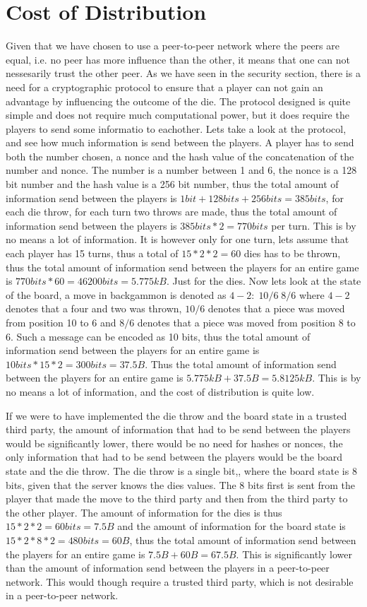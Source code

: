 \documentclass[ twoside,openright,titlepage,numbers=noenddot,headinclude,%
                footinclude=true,cleardoublepage=empty,abstractoff, %
                BCOR=5mm,paper=a4,fontsize=11pt,%
                ngerman,american,%
                ]{scrreprt}
\begin{document}
\section{Cost of Distribution}
Given that we have chosen to use a peer-to-peer network where the peers are equal, i.e. no peer has more influence than the other, it means that one can not nessesarily trust the other peer. As we have seen in the security section, there is a need for a cryptographic protocol to ensure that a player can not gain an advantage by influencing the outcome of the die. The protocol designed is quite simple and does not require much computational power, but it does require the players to send some informatio to eachother. Lets take a look at the protocol, and see how much information is send between the players. A player has to send both the number chosen, a nonce and the hash value of the concatenation of the number and nonce. The number is a number between 1 and 6, the nonce is a 128 bit number and the hash value is a 256 bit number, thus the total amount of information send between the players is $1bit+128bits+256bits = 385bits$, for each die throw, for each turn two throws are made, thus the total amount of information send between the players is $385bits*2 = 770bits$ per turn. This is by no means a lot of information. It is however only for one turn, lets assume that each player has 15 turns, thus a total of $15*2*2 = 60$ dies has to be thrown, thus the total amount of information send between the players for an entire game is $770bits*60 = 46200bits = 5.775kB$. Just for the dies. Now lets look at the state of the board, a move in backgammon is denoted as $4-2:\; 10/6\; 8/6$ where $4-2$ denotes that a four and two was thrown, $10/6$ denotes that a piece was moved from position 10 to 6 and $8/6$ denotes that a piece was moved from position 8 to 6. Such a message can be encoded as 10 bits, thus the total amount of information send between the players for an entire game is $10bits*15*2 = 300bits = 37.5B$. Thus the total amount of information send between the players for an entire game is $5.775kB + 37.5B = 5.8125kB$. This is by no means a lot of information, and the cost of distribution is quite low. 

If we were to have implemented the die throw and the board state in a trusted third party, the amount of information that had to be send between the players would be significantly lower, there would be no need for hashes or nonces, the only information that had to be send between the players would be the board state and the die throw. The die throw is a single bit,, where the board state is 8 bits, given that the server knows the dies values. The 8 bits first is sent from the player that made the move to the third party and then from the third party to the other player. The amount of information for the dies is thus $15*2*2 = 60bits = 7.5B$ and the amount of information for the board state is $15*2*8*2 = 480bits = 60B$, thus the total amount of information send between the players for an entire game is $7.5B + 60B = 67.5B$. This is significantly lower than the amount of information send between the players in a peer-to-peer network. This would though require a trusted third party, which is not desirable in a peer-to-peer network.
\end{document}
